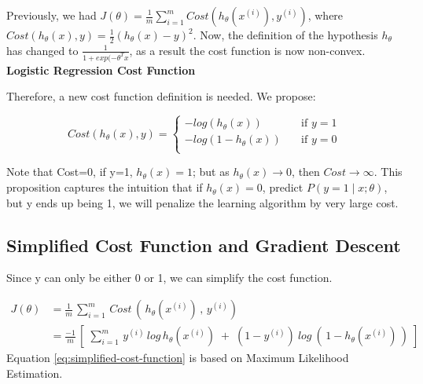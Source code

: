         Previously, we had $ J(\theta) = \frac{1}{m} \sum_{i=1}^{m} Cost( h_\theta ( x^{(i)}), y^{(i)} )$, where $Cost (h_\theta(x), y) = \frac{1}{2} (h_\theta(x) - y)^2$. 
        Now, the definition of the hypothesis $h_\theta$ has changed to $\frac{1}{1+exp(-\theta^T x}$, as a result the cost function is now non-convex. \\ 
        
            \textbf{Logistic Regression Cost Function}

            Therefore, a new cost function definition is needed. We propose: 

            \[
                Cost (h_\theta(x), y) = 
                \begin{cases}
                    -log(h_\theta(x))       &\quad \text{if } y=1 \\
                    -log(1- h_\theta(x))    &\quad \text{if } y=0 \\
                \end{cases}
            \] 

            Note that Cost=0, if y=1, $h_\theta(x) =1$; but as $h_\theta(x) \to 0$, then $Cost \to \infty$. This proposition captures the intuition that if $h_\theta(x)=0$, predict $P(y=1 \mid x;\theta)$, but y ends up being 1, we will penalize the learning algorithm by very large cost.
            
    \subsection{Simplified Cost Function and Gradient Descent}
        

            Since y can only be either 0 or 1, we can simplify the cost function.
       

            \begin{equation}
                \begin{split}
                    J(\theta)   &= \frac{1}{m}\, \sum_{i=1}^{m}\, Cost\,(\, h_\theta ( x^{(i)})\, ,\, y^{(i)} ) \\
                    &= \frac{-1}{m} \, [ \; \sum_{i=1}^{m}\, y^{(i)}\, log\, h_\theta (x^{(i)})\; +\; (1-y^{(i)})\: log\:(\,1-h_\theta(x^{(i)})\,) \;] 
                \end{split}
                \label{eq:simplified-cost-function}
            \end{equation}
            Equation \ref{eq:simplified-cost-function} is based on Maximum Likelihood Estimation.


